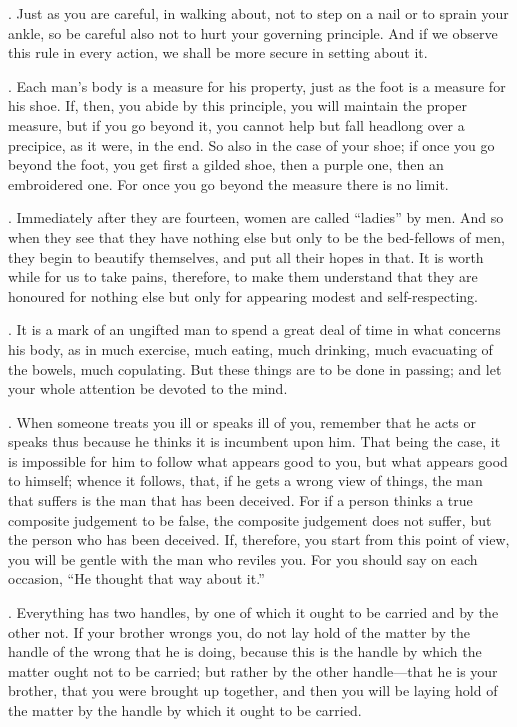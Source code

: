 . Just as you are careful, in walking about, not to step on a nail or to sprain your ankle, so be careful also not to hurt your governing principle. And if we observe this rule in every action, we shall be more secure in setting about it.

. Each man's body is a measure for his property, just as the foot is a measure for his shoe. If, then, you abide by this principle, you will maintain the proper measure, but if you go beyond it, you cannot help but fall headlong over a precipice, as it were, in the end. So also in the case of your shoe; if once you go beyond the foot, you get first a gilded shoe, then a purple one, then an embroidered one. For once you go beyond the measure there is no limit.

. Immediately after they are fourteen, women are called ``ladies'' by men. And so when they see that they have nothing else but only to be the bed-fellows of men, they begin to beautify themselves, and put all their hopes in that. It is worth while for us to take pains, therefore, to make them understand that they are honoured for nothing else but only for appearing modest and self-respecting.

. It is a mark of an ungifted man to spend a great deal of time in what concerns his body, as in much exercise, much eating, much drinking, much evacuating of the bowels, much copulating. But these things are to be done in passing; and let your whole attention be devoted to the mind.

. When someone treats you ill or speaks ill of you, remember that he acts or speaks thus because he thinks it is incumbent upon him. That being the case, it is impossible for him to follow what appears good to you, but what appears good to himself; whence it follows, that, if he gets a wrong view of things, the man that suffers is the man that has been deceived. For if a person thinks a true composite judgement to be false, the composite judgement does not suffer, but the person who has been deceived. If, therefore, you start from this point of view, you will be gentle with the man who reviles you. For you should say on each occasion, ``He thought that way about it.''

. Everything has two handles, by one of which it ought to be carried and by the other not. If your brother wrongs you, do not lay hold of the matter by the handle of the wrong that he is doing, because this is the handle by which the matter ought not to be carried; but rather by the other handle—that he is your brother, that you were brought up together, and then you will be laying hold of the matter by the handle by which it ought to be carried.

